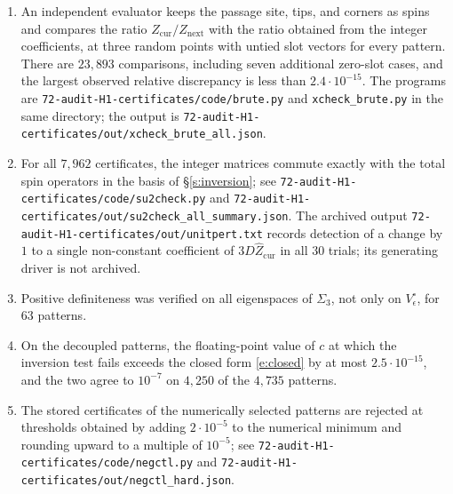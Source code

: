 \begin{enumerate}
\item An independent evaluator keeps the passage site, tips, and corners as spins and compares the ratio $Z_{\mathrm{cur}}/Z_{\mathrm{next}}$ with the ratio obtained from the integer coefficients, at three random points with untied slot vectors for every pattern. There are $23{,}893$ comparisons, including seven additional zero-slot cases, and the largest observed relative discrepancy is less than $2.4\cdot10^{-15}$. The programs are \texttt{72-\allowbreak audit-\allowbreak H1-\allowbreak certificates/\allowbreak code/\allowbreak brute.py} and \texttt{xcheck\_\allowbreak brute.py} in the same directory; the output is \texttt{72-\allowbreak audit-\allowbreak H1-\allowbreak certificates/\allowbreak out/\allowbreak xcheck\_\allowbreak brute\_\allowbreak all.json}.
\item For all $7{,}962$ certificates, the integer matrices commute exactly with the total spin operators in the basis of \S\ref{s:inversion}; see \texttt{72-\allowbreak audit-\allowbreak H1-\allowbreak certificates/\allowbreak code/\allowbreak su2check.py} and \texttt{72-\allowbreak audit-\allowbreak H1-\allowbreak certificates/\allowbreak out/\allowbreak su2check\_\allowbreak all\_\allowbreak summary.json}. The archived output \texttt{72-\allowbreak audit-\allowbreak H1-\allowbreak certificates/\allowbreak out/\allowbreak unitpert.txt} records detection of a change by $1$ to a single non-constant coefficient of $3D\hat Z_{\mathrm{cur}}$ in all $30$ trials; its generating driver is not archived.
\item Positive definiteness was verified on all eigenspaces of $\Sigma_3$, not only on $V_\epsilon^{\circ}$, for $63$ patterns.
\item On the decoupled patterns, the floating-point value of $c$ at which the inversion test fails exceeds the closed form \eqref{e:closed} by at most $2.5 \cdot 10^{-15}$, and the two agree to $10^{-7}$ on $4{,}250$ of the $4{,}735$ patterns.
\item The stored certificates of the numerically selected patterns are rejected at thresholds obtained by adding $2\cdot10^{-5}$ to the numerical minimum and rounding upward to a multiple of $10^{-5}$; see \texttt{72-\allowbreak audit-\allowbreak H1-\allowbreak certificates/\allowbreak code/\linebreak[1]negctl.py}\linebreak
and \texttt{72-\allowbreak audit-\allowbreak H1-\allowbreak certificates/\allowbreak out/\allowbreak negctl\_\allowbreak hard.json}.
\end{enumerate}
